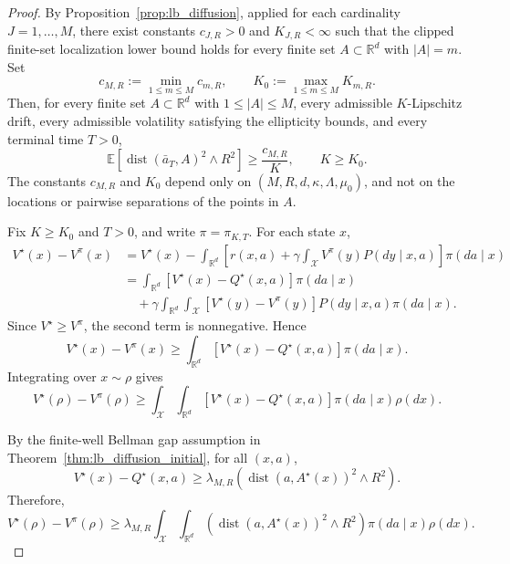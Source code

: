 \documentclass{article}
\newcommand{\1}{\mathbbm{1}}
\numberwithin{equation}{section}
\begin{document}
\begin{proof}
By Proposition~\ref{prop:lb_diffusion}, applied for each cardinality
\(J=1,\ldots,M\), there exist constants \(c_{J,R}>0\) and
\(K_{J,R}<\infty\) such that the clipped finite-set localization lower
bound holds for every finite set \(A\subset\mathbb R^d\) with
\(|A|=m\). Set
\[
    c_{M,R}:=\min_{1\le m\le M} c_{m,R},
    \qquad
    K_0:=\max_{1\le m\le M} K_{m,R}.
\]
Then, for every finite set \(A\subset\mathbb R^d\) with
\(1\le |A|\le M\), every admissible \(K\)-Lipschitz drift, every admissible
volatility satisfying the ellipticity bounds, and every terminal time
\(T>0\),
\begin{equation}
\label{eq:clipped-localization-uniform-M}
    \mathbb E\left[
        \operatorname{dist}(\bar a_T,A)^2\wedge R^2
    \right]
    \ge
    \frac{c_{M,R}}{K},
    \qquad K\ge K_0 .
\end{equation}
The constants \(c_{M,R}\) and \(K_0\) depend only on
\((M,R,d,\kappa,\Lambda,\mu_0)\), and not on the locations or pairwise
separations of the points in \(A\).

Fix \(K\ge K_0\) and \(T>0\), and write
\(\pi=\pi_{K,T}\). For each state \(x\),
\[
\begin{aligned}
V^\star(x)-V^\pi(x)
&=
V^\star(x)
-
\int_{\mathbb R^d}
\left[
r(x,a)+\gamma\int_{\mathcal X} V^\pi(y)P(dy\mid x,a)
\right]\pi(da\mid x)  \\
&=
\int_{\mathbb R^d}
\left[
V^\star(x)-Q^\star(x,a)
\right]\pi(da\mid x)  \\
&\quad+
\gamma
\int_{\mathbb R^d}
\int_{\mathcal X}
\left[
V^\star(y)-V^\pi(y)
\right]
P(dy\mid x,a)\pi(da\mid x).
\end{aligned}
\]
Since \(V^\star\ge V^\pi\), the second term is nonnegative. Hence
\begin{equation}
\label{eq:value-gap-one-step-lower}
V^\star(x)-V^\pi(x)
\ge
\int_{\mathbb R^d}
\left[
V^\star(x)-Q^\star(x,a)
\right]\pi(da\mid x).
\end{equation}
Integrating over \(x\sim\rho\) gives
\[
V^\star(\rho)-V^\pi(\rho)
\ge
\int_{\mathcal X}
\int_{\mathbb R^d}
\left[
V^\star(x)-Q^\star(x,a)
\right]\pi(da\mid x)\rho(dx).
\]

By the finite-well Bellman gap assumption in Theorem~\ref{thm:lb_diffusion_initial},
for all \((x,a)\),
\[
    V^\star(x)-Q^\star(x,a)
    \ge
    \lambda_{M,R}
    \left(
        \operatorname{dist}(a,A^\star(x))^2\wedge R^2
    \right).
\]
Therefore,
\begin{equation}
\label{eq:value-gap-to-localization}
V^\star(\rho)-V^\pi(\rho)
\ge
\lambda_{M,R}
\int_{\mathcal X}
\int_{\mathbb R^d}
\left(
    \operatorname{dist}(a,A^\star(x))^2\wedge R^2
\right)
\pi(da\mid x)\rho(dx).
\end{equation}


\end{proof}
\end{document}
